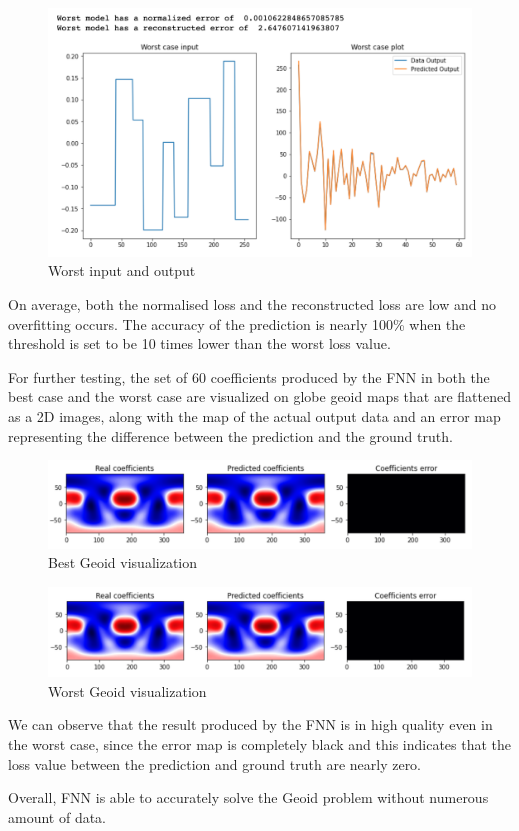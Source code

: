 \begin{figure}[H]
    \caption{Worst input and output}
    \includegraphics[scale=0.6]{figures/geoid_images/Geoid_Worst.png}
\end{figure}

On average, both the normalised loss and the reconstructed loss are low and no overfitting occurs. The accuracy of the prediction is nearly 100\% when the threshold is set to be 10 times lower than the worst loss value. 

For further testing, the set of 60 coefficients produced by the FNN in both the best case and the worst case are visualized on globe geoid maps that are flattened as a 2D images, along with the map of the actual output data and an error map representing the difference between the prediction and the ground truth.

\begin{figure}[H]
    \caption{Best Geoid visualization}
    \includegraphics[scale=0.6]{figures/geoid_images/Geoid_Best_visualization.png}
\end{figure}

\begin{figure}[H]
    \caption{Worst Geoid visualization}
    \includegraphics[scale=0.6]{figures/geoid_images/Geoid_Worst_visualization.png}
\end{figure}

We can observe that the result produced by the FNN is in high quality even in the worst case, since the error map is completely black and this indicates that the loss value between the prediction and ground truth are nearly zero.

Overall, FNN is able to accurately solve the Geoid problem without numerous amount of data.


